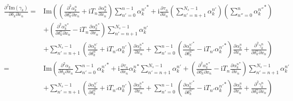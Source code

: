 \documentclass[10pt,fleqn]{article}
\newcommand{\ui}{\mathrm{i}}
\newcommand{\eqar}[1]
{
  \begin{align*}
    #1
  \end{align*}
}
\newcommand{\paren}[1]{{\left({#1}\right)}}
\newcommand{\lparen}[1]{{\left({#1}\right.}}
\newcommand{\rparen}[1]{{\left.{#1}\right)}}
\newcommand{\pdiff}[3][{}]{{\frac{\partial^{#1} {#2}}{\partial {#3}{}^{#1}}}}
\begin{document}
\eqar{
  \frac{\partial^2\mathrm{Im}(\gamma_k)}{\partial\delta_k\partial x_n}=&
  \mathrm{Im}\lparen{
    \paren{
      \frac{\partial^2\alpha_k^{n}}{\partial\delta_k^{n}\partial x_n}
      +\ui T_{n}\pdiff{\alpha_k^{n}}{x_n}}
    \sum_{n'=0}^{n-1}\!\!{\alpha_k^{n'}}^*\!\!
    +\ui\pdiff{\tau_{n}}{x_n}\paren{\sum_{n'=n+1}^{N_s-1}\!\!\alpha_k^{n'}}\paren{\sum_{n''=0}^{n}\!\!{\alpha_k^{n''}}^*}
  }\\
  &
  +\paren{
    \frac{\partial^2{\alpha_k^n}^*}{\partial\delta_k^n\partial x_n}
    -\ui T_n\pdiff{{\alpha_k^n}^*}{x_n}
  }\!\!\!\!\sum_{n'=n+1}^{N_s-1}\!\!\!\!\alpha_k^{n'}
  \\
  &\rparen{
    +\!\!\!\!\sum_{n'=n+1}^{N_s-1}\!\!\paren{
      \pdiff{\alpha_k^{n'}}{\delta_k^{n'}}+\ui T_{n'}\alpha_k^{n'}}
    \pdiff{{\alpha_k^{n}}^*}{x_n}
    +\sum_{n'=0}^{n-1}\!\!\paren{\pdiff{{\alpha_k^{n'}}^*}{\delta_k^{n'}}-\ui T_{n'}{\alpha_k^{n'}}^*}\pdiff{\alpha_k^{n}}{x_n}
    +\frac{\partial^2\gamma_k^n}{\partial\delta_k^n\partial x_n}}\\
  =&
  \mathrm{Im}\lparen{
    \frac{\partial^2\alpha_k}{\partial\delta_k\partial x_n}
    \sum_{n'=0}^{n-1}\!\!{\alpha_k^{n'}}^*\!\!
    +\ui\pdiff{\tau_{n}}{x_n}{\alpha_k^n}^*\!\!\!\!\sum_{n'=n+1}^{N_s-1}\!\!\!\!\alpha_k^{n'}
    +\paren{
      \frac{\partial^2{\alpha_k^n}^*}{\partial\delta_k^n\partial x_n}
      -\ui T_n\pdiff{{\alpha_k^n}^*}{x_n}
    }
  }\!\!\!\!\sum_{n'=n+1}^{N_s-1}\!\!\!\!\alpha_k^{n'}
  \\
  &\rparen{
    +\!\!\!\!\sum_{n'=n+1}^{N_s-1}\!\!\paren{
      \pdiff{\alpha_k^{n'}}{\delta_k^{n'}}+\ui T_{n'}\alpha_k^{n'}}
    \pdiff{{\alpha_k^{n}}^*}{x_n}
    +\sum_{n'=0}^{n-1}\!\!\paren{\pdiff{{\alpha_k^{n'}}^*}{\delta_k^{n'}}-\ui T_{n'}{\alpha_k^{n'}}^*}\pdiff{\alpha_k^{n}}{x_n}
    +\frac{\partial^2\gamma_k^n}{\partial\delta_k^n\partial x_n}}
}
\end{document}
